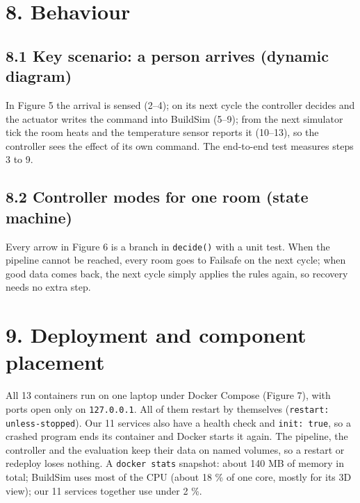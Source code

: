 \documentclass[11pt]{article}
\begin{document}
\section{8. Behaviour}\label{behaviour}

\subsection{8.1 Key scenario: a person arrives (dynamic diagram)}


In Figure 5 the arrival is sensed (2--4); on its next cycle the controller decides and the actuator writes the
command into BuildSim (5--9); from the next simulator tick the room heats and the temperature
sensor reports it (10--13), so the controller sees the effect of its own command. The end-to-end test
measures steps 3 to 9.

\subsection{8.2 Controller modes for one room (state machine)}


Every arrow in Figure 6 is a branch in \texttt{decide()} with a unit test. When the pipeline cannot be reached,
every room goes to Failsafe on the next cycle; when good data comes back, the next cycle simply
applies the rules again, so recovery needs no extra step.

\section{9. Deployment and component placement}\label{deployment}


All 13 containers run on one laptop under Docker Compose (Figure 7), with ports open only on
\texttt{127.0.0.1}. All of them restart by themselves (\texttt{restart: unless-stopped}). Our 11
services also have a health check and \texttt{init: true}, so a crashed program ends its container
and Docker starts it again. The pipeline, the controller and the evaluation keep their data on
named volumes, so a restart or redeploy loses nothing. A \texttt{docker stats} snapshot: about
140 MB of memory in total; BuildSim uses most of the CPU (about 18 \% of one core, mostly for its
3D view); our 11 services together use under 2 \%.
\end{document}
